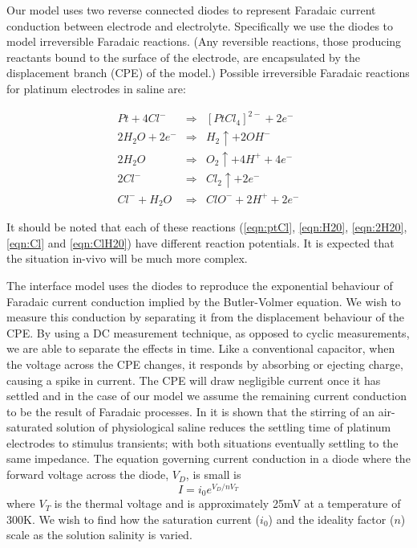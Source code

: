 \documentclass[journal, a4paper]{IEEEtran}
\begin{document}
Our model uses two reverse connected diodes to represent Faradaic current conduction between electrode and electrolyte. Specifically we use the diodes to model irreversible Faradaic reactions. (Any reversible reactions, those producing reactants bound to the surface of the electrode, are encapsulated by the displacement branch (CPE) of the model.)
Possible irreversible Faradaic reactions for platinum electrodes in saline are:

\begin{align}
    Pt + 4Cl^{-} &\Rightarrow& [PtCl_{4}]^{2-} + 2 e^{-} \label{eqn:ptCl}\\
    2H_{2}O + 2 e^{-} &\Rightarrow& H_{2}\uparrow + 2OH^{-} \label{eqn:H20}\\
    2H_{2}O &\Rightarrow& O_{2}\uparrow + 4H^{+} + 4e^{-} \label{eqn:2H20}\\
    2Cl^{-} &\Rightarrow& Cl_{2}\uparrow + 2e^{-} \label{eqn:Cl} \\
    Cl^{-} + H_{2}O &\Rightarrow& ClO^{-} + 2H^{+} + 2e^{-} \label{eqn:ClH20}
\end{align}

{
    \color{blue}
    It should be noted that each of these reactions (\ref{eqn:ptCl}, \ref{eqn:H20}, \ref{eqn:2H20}, \ref{eqn:Cl} and \ref{eqn:ClH20}) have different reaction potentials. It is expected that the situation in-vivo will be much more complex.
}

The interface model uses the diodes to reproduce the exponential behaviour of Faradaic current conduction implied by the Butler-Volmer equation. We wish to measure this conduction by separating it from the displacement behaviour of the CPE. By using a DC measurement technique, as opposed to cyclic measurements, we are able to separate the effects in time.
Like a conventional capacitor, when the voltage across the CPE changes, it responds by absorbing or ejecting charge, causing a spike in current. The CPE will draw negligible current once it has settled and in the case of our model we assume the remaining current conduction to be the result of Faradaic processes.
In \cite{Greatbatch1969} it is shown that the stirring of an air-saturated solution of physiological saline reduces the settling time of platinum electrodes to stimulus transients; with both situations eventually settling to the same impedance.
The equation governing current conduction in a diode where the forward voltage across the diode, $V_{D}$, is small is
\begin{equation}
    I = i_{0}  e^{V_{D} / n V_{T}}
\end{equation}
where $V_{T}$ is the thermal voltage and is approximately 25\thinspace mV at a temperature of 300\thinspace K. We wish to find how the saturation current ($i_{0}$) and the ideality factor ($n$) scale as the solution salinity is varied.
\end{document}
